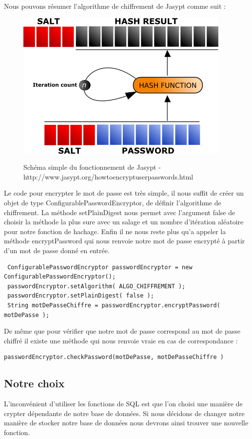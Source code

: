 Nous pouvons résumer l'algorithme de chiffrement de Jasypt comme suit :\\
\begin{figure}[!h]
  \center
  \includegraphics[scale=0.7]{../graph/passwordEncryption.png} \\
  \caption{Schéma simple du fonctionnement de Jasypt - http://www.jasypt.org/howtoencryptuserpasswords.html}
\end{figure}
Le code pour encrypter le mot de passe est très simple, il nous suffit de créer un objet de type ConfigurablePasswordEncryptor, de définir l'algorithme de chiffrement. La méthode setPlainDigest nous permet avec l'argument false de choisir la méthode la plus sure avec un salage et un nombre d'itération aléatoire pour notre fonction de hachage. Enfin il ne nous reste plus qu'a appeler la méthode encryptPassword qui nous renvoie notre mot de passe encrypté à partir d'un mot de passe donné en entrée. 
\begin{lstlisting}
 ConfigurablePasswordEncryptor passwordEncryptor = new ConfigurablePasswordEncryptor();
 passwordEncryptor.setAlgorithm( ALGO_CHIFFREMENT );
 passwordEncryptor.setPlainDigest( false );
 String motDePasseChiffre = passwordEncryptor.encryptPassword( motDePasse );
\end{lstlisting} 


De même que pour vérifier que notre mot de passe correspond au mot de passe chiffré il existe une méthode qui nous renvoie vraie en cas de correspondance :

\begin{lstlisting}
passwordEncryptor.checkPassword(motDePasse, motDePasseChiffre )
\end{lstlisting}


\subsection{Notre choix}
L'inconvénient d'utiliser les fonctions de SQL est que l'on choisi une manière de crypter dépendante de notre base de données. Si nous décidons de changer notre manière de stocker notre base de données nous devrons ainsi trouver une nouvelle fonction. \\

